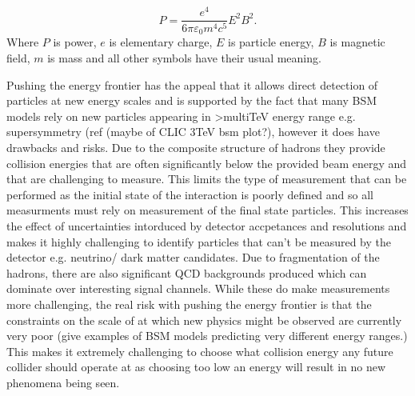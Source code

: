 \begin{equation}
\label{Eq:synchotron radiation}
P = \frac{e^4}{6\pi\varepsilon_0m^4c^5}E^2B^2.
\end{equation}
Where $P$ is power, $e$ is elementary charge, $E$ is particle energy, $B$ is magnetic field, $m$ is mass and all other symbols have their usual meaning.

Pushing the energy frontier has the appeal that it allows direct detection of particles at new energy scales and is supported by the fact that many \ac{BSM} models rely on new particles appearing in >multiTeV energy range e.g. supersymmetry (ref (maybe of CLIC 3TeV bsm plot?), however it does have drawbacks and risks. Due to the composite structure of hadrons they provide collision energies that are often significantly below the provided beam energy and that are challenging to measure. This limits the type of measurement that can be performed as the initial state of the interaction is poorly defined and so all measurments must rely on measurement of the final state particles. This increases the effect of uncertainties intorduced by detector accpetances and resolutions and makes it highly challenging to identify particles that can't be measured by the detector e.g. neutrino/ dark matter candidates. Due to fragmentation of the hadrons, there are also significant \ac{QCD} backgrounds produced which can dominate over interesting signal channels. While these do make measurements more challenging, the real risk with pushing the energy frontier is that the constraints on the scale of at which new physics might be observed are currently very poor (give examples of BSM models predicting very different energy ranges.) This makes it extremely challenging to choose what collision energy any future collider should operate at as choosing too low an energy will result in no new phenomena being seen.

